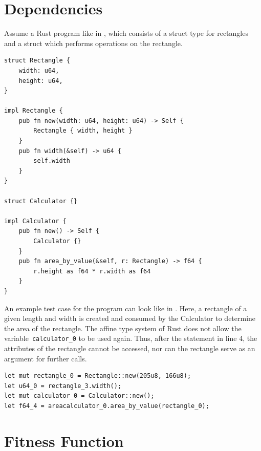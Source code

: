 \documentclass[paper=a4,%
  twoside,%
  BCOR4mm,%
  abstract=true,%
  toc=bibliography,%
  chapterprefix=true,%
  toc=bibliographynumbered,%
  open=right,%
  english,%
  pagesize=pdftex]{scrreprt}
\begin{document}

\section{Dependencies}
\label{sec:dependencies}
Assume a Rust program like in , which consists of a struct type for rectangles and a struct which performs operations on the rectangle.
\begin{lstlisting}[style=boxed, caption={Rectangle data type}, label=lst:example-rust-program]
struct Rectangle {
    width: u64,
    height: u64,
}

impl Rectangle {
    pub fn new(width: u64, height: u64) -> Self {
        Rectangle { width, height }
    }
    pub fn width(&self) -> u64 {
        self.width
    }
}

struct Calculator {}

impl Calculator {
    pub fn new() -> Self {
        Calculator {}
    }
    pub fn area_by_value(&self, r: Rectangle) -> f64 {
        r.height as f64 * r.width as f64
    }
}
\end{lstlisting}

An example test case for the program can look like in . Here, a rectangle of a given length and width is created and consumed by the Calculator to determine the area of the rectangle. The affine type system of Rust does not allow the variable~\texttt{calculator\string_0} to be used again. Thus, after the statement in line 4, the attributes of the rectangle cannot be accessed, nor can the rectangle serve as an argument for further calls.

\begin{lstlisting}[style=boxed, caption={An example test case generated for the program in \Cref{lst:example-rust-program}}, label=lst:example-testcase]
let mut rectangle_0 = Rectangle::new(205u8, 166u8);
let u64_0 = rectangle_3.width();
let mut calculator_0 = Calculator::new();
let f64_4 = areacalculator_0.area_by_value(rectangle_0);
\end{lstlisting}


\section{Fitness Function}
\label{sec:fitness-function}
\end{document}
